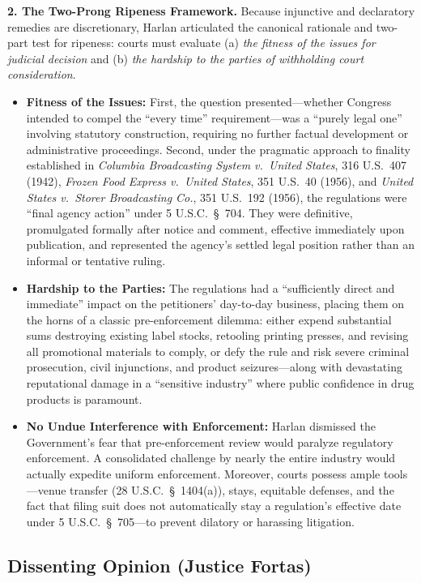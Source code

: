 \documentclass[12pt]{article}
\begin{document}
\textbf{2. The Two-Prong Ripeness Framework.}
Because injunctive and declaratory remedies are discretionary, Harlan articulated the canonical rationale and two-part test for ripeness: courts must evaluate (a) \emph{the fitness of the issues for judicial decision} and (b) \emph{the hardship to the parties of withholding court consideration}.
\begin{itemize}
    \item \textbf{Fitness of the Issues:} First, the question presented---whether Congress intended to compel the ``every time'' requirement---was a ``purely legal one'' involving statutory construction, requiring no further factual development or administrative proceedings. Second, under the pragmatic approach to finality established in \textit{Columbia Broadcasting System v.\ United States}, 316 U.S.\ 407 (1942), \textit{Frozen Food Express v.\ United States}, 351 U.S.\ 40 (1956), and \textit{United States v.\ Storer Broadcasting Co.}, 351 U.S.\ 192 (1956), the regulations were ``final agency action'' under 5 U.S.C.\ \S~704. They were definitive, promulgated formally after notice and comment, effective immediately upon publication, and represented the agency's settled legal position rather than an informal or tentative ruling.
    \item \textbf{Hardship to the Parties:} The regulations had a ``sufficiently direct and immediate'' impact on the petitioners' day-to-day business, placing them on the horns of a classic pre-enforcement dilemma: either expend substantial sums destroying existing label stocks, retooling printing presses, and revising all promotional materials to comply, or defy the rule and risk severe criminal prosecution, civil injunctions, and product seizures---along with devastating reputational damage in a ``sensitive industry'' where public confidence in drug products is paramount.
    \item \textbf{No Undue Interference with Enforcement:} Harlan dismissed the Government's fear that pre-enforcement review would paralyze regulatory enforcement. A consolidated challenge by nearly the entire industry would actually expedite uniform enforcement. Moreover, courts possess ample tools---venue transfer (28 U.S.C.\ \S~1404(a)), stays, equitable defenses, and the fact that filing suit does not automatically stay a regulation's effective date under 5 U.S.C.\ \S~705---to prevent dilatory or harassing litigation.
\end{itemize}

\subsection{Dissenting Opinion (Justice Fortas)}
\end{document}
